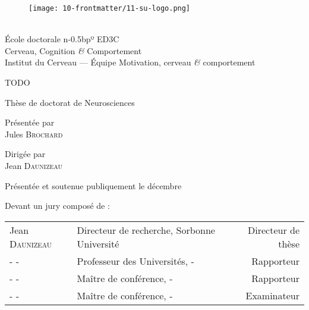 \thispagestyle{empty}

\begin{fullwidth}
    \begingroup
       \begin{figure}
            \texttt{[image: 10-frontmatter/11-su-logo.png]}
        \end{figure}
        \vspace{15px}
        
        \begin{center}
             \\
            
             \large École doctorale n\kern-0.5bpº ED3C \\
             
             \small Cerveau, Cognition \textit{\&} Comportement \\[1\baselineskip]
             
             \large Institut du Cerveau --- Équipe Motivation, cerveau \textit{\&} comportement \vfill
        
            {\Huge \textcolor{ceruleanblue}{TODO} \par} \vfill
            {\Huge {}} \vfill
            
            Thèse de doctorat de Neurosciences \vfill
            
            Présentée par \\
            {\Large Jules \textsc{Brochard}} \vfill
            
            
            Dirigée par \\
            {\Large Jean \textsc{Daunizeau}} \vfill
            
            \small Présentée et soutenue publiquement le  décembre  \vfill
        \end{center}
        
        \raggedright
        Devant un jury composé de :
        
        \centering
        \begin{tabular}{llr}
    		Jean \textsc{Daunizeau} & Directeur de recherche, Sorbonne Université & Directeur de thèse \\
    	    - \textsc{-} & Professeur des Universités, - & Rapporteur \\
    	    - \textsc{-} & Maître de conférence, - & Rapporteur \\
            - \textsc{-} & Maître de conférence, - & Examinateur \\
    	\end{tabular}

        
        \vspace*{10px}
    \endgroup
\end{fullwidth}

